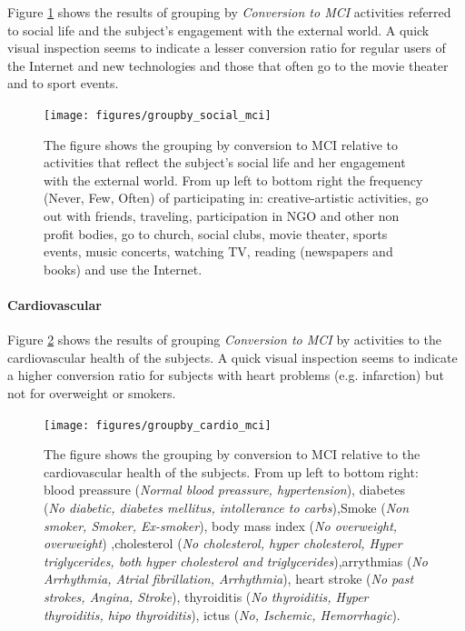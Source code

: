 \documentclass[11pt]{article}
\theoremstyle{definition}
\theoremstyle{remark}
\begin{document}
Figure \ref{fig:groupby_social_mci} shows the results of grouping by \emph{Conversion to MCI} activities referred to social life and the subject's engagement with the external world. A quick visual inspection seems to indicate a lesser conversion ratio for regular users of the Internet and new technologies and those that often go to the movie theater and to sport events.

\begin{figure}[H]
        \centering
        \texttt{[image: figures/groupby\_social\_mci]}
        \caption{The figure shows the grouping by conversion to MCI relative to activities that reflect the subject's social life and her  engagement with the external world. From up left to bottom right the frequency (Never, Few, Often) of participating in: creative-artistic activities, go out with friends, traveling, participation in NGO and other non profit bodies, go to church,  
        social clubs, movie theater, sports events, music concerts, watching TV, reading (newspapers and books) and use the Internet.}
        \label{fig:groupby_social_mci}
\end{figure}


\paragraph*{Cardiovascular}
Figure \ref{fig:groupby_cardio_mci} shows the results of grouping \emph{Conversion to MCI} by activities to the cardiovascular health of the subjects. A quick visual inspection seems to indicate a higher conversion ratio for subjects with heart problems (e.g. infarction) but not for overweight or smokers.

\begin{figure}[H]
        \centering
        \texttt{[image: figures/groupby\_cardio\_mci]}
        \caption{The figure shows the grouping by conversion to MCI relative to the cardiovascular health of the subjects. From up left to bottom right: blood preassure (\emph{Normal blood preassure, hypertension}), diabetes (\emph{No diabetic, diabetes mellitus, intollerance to carbs}),Smoke (\emph{Non smoker, Smoker, Ex-smoker}), body mass index (\emph{No overweight, overweight}) ,cholesterol (\emph{No cholesterol, hyper cholesterol, Hyper triglycerides, both hyper cholesterol and triglycerides}),arrythmias (\emph{No Arrhythmia, Atrial fibrillation, Arrhythmia}), heart stroke (\emph{No past strokes, Angina, Stroke}), thyroiditis (\emph{No thyroiditis, Hyper thyroiditis, hipo thyroiditis}), ictus (\emph{No, Ischemic, Hemorrhagic}).}
        \label{fig:groupby_cardio_mci}
\end{figure}
\end{document}
